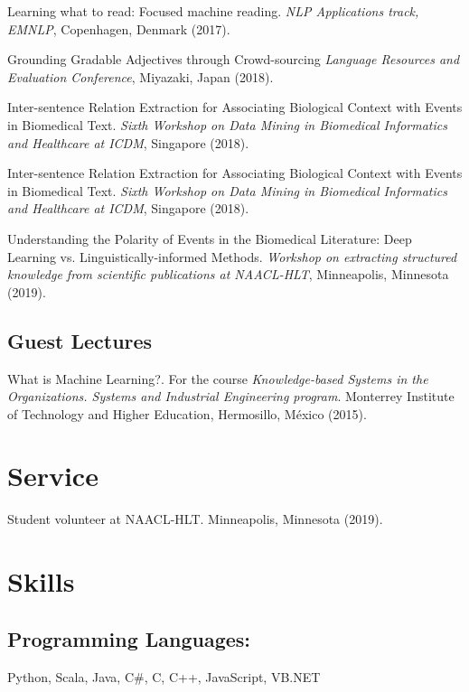 \documentclass[letterpaper]{article}
\renewenvironment{itemize}{
  \begin{list}{}{
    \setlength{\leftmargin}{1.5em}
  }
}{
  \end{list}
}
\begin{document}
\begin{itemize}
	
\item Learning what to read: Focused machine reading. \textit{NLP Applications track, EMNLP}, Copenhagen, Denmark (2017).
\item Grounding Gradable Adjectives through Crowd-sourcing \textit{Language Resources and Evaluation Conference}, Miyazaki, Japan (2018).
\item Inter-sentence Relation Extraction for Associating Biological Context with Events in Biomedical Text. \textit{Sixth Workshop on Data Mining in Biomedical Informatics and Healthcare at ICDM}, Singapore (2018).
\item Inter-sentence Relation Extraction for Associating Biological Context with Events in Biomedical Text. \textit{Sixth Workshop on Data Mining in Biomedical Informatics and Healthcare at ICDM}, Singapore (2018).
\item Understanding the Polarity of Events in the Biomedical Literature: Deep Learning vs. Linguistically-informed Methods. \textit{Workshop on extracting structured knowledge from scientific publications at NAACL-HLT}, Minneapolis, Minnesota (2019).
\end{itemize}

\subsection*{Guest Lectures}
\begin{itemize}
	\item What is Machine Learning?. For the course \textit{Knowledge-based Systems in the Organizations. Systems and Industrial Engineering program}. Monterrey Institute of Technology and Higher Education, Hermosillo, M\'{e}xico (2015).
\end{itemize}

\section*{Service}
\begin{itemize}
	\item Student volunteer at NAACL-HLT. Minneapolis, Minnesota (2019).
\end{itemize}
\section*{Skills}
\subsection*{Programming Languages:}
\begin{itemize}
	\item Python, Scala, Java, C\#, C, C++, JavaScript, VB.NET
\end{itemize}
\end{document}
